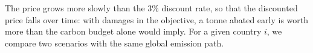 \documentclass[12pt,english]{article}
\theoremstyle{remark}
\begin{document}
The price grows more slowly than the 3\% discount rate, so that the discounted price falls over time: with damages in the objective, a tonne abated early is worth more than the carbon budget alone would imply. %
For a given country $i$, we compare two scenarios with the same global emission path.
\end{document}
